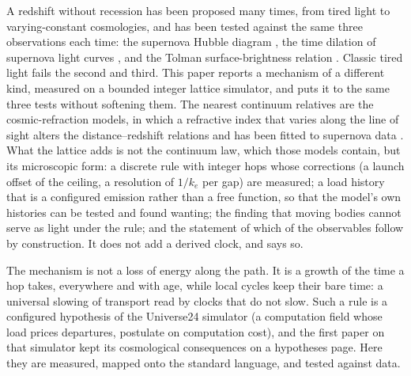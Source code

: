 \documentclass[11pt]{article}
\begin{document}
A redshift without recession has been proposed many times, from tired light
\cite{zwicky1929} to varying-constant cosmologies, and has been tested
against the same three observations each time: the supernova Hubble diagram
\cite{riess1998,perlmutter1999,scolnic2022,brout2022}, the time dilation of
supernova light curves \cite{blondin2008}, and the Tolman surface-brightness
relation \cite{lubin2001}. Classic tired light fails the second and third.
This paper reports a mechanism of a different kind, measured on a bounded
integer lattice simulator, and puts it to the same three tests without
softening them. The nearest continuum relatives are the cosmic-refraction
models, in which a refractive index that varies along the line of sight
alters the distance--redshift relations and has been fitted to supernova
data \cite{chen2008}. What the lattice adds is not the continuum law,
which those models contain, but its microscopic form: a discrete rule with
integer hops whose corrections (a launch offset of the ceiling, a
resolution of $1/k_e$ per gap) are measured; a load history that is a
configured emission rather than a free function, so that the model's own
histories can be tested and found wanting; the finding that moving bodies
cannot serve as light under the rule; and the statement of which of the
observables follow by construction. It does not add a derived clock, and
says so.

The mechanism is not a loss of energy along the path. It is a growth of the
time a hop takes, everywhere and with age, while local cycles keep their bare
time: a universal slowing of transport read by clocks that do not slow. Such
a rule is a configured hypothesis of the Universe24 simulator (a computation
field whose load prices departures, postulate on computation cost), and the
first paper on that simulator \cite{paper1} kept its cosmological
consequences on a hypotheses page. Here they are measured, mapped onto the
standard language, and tested against data.
\end{document}
